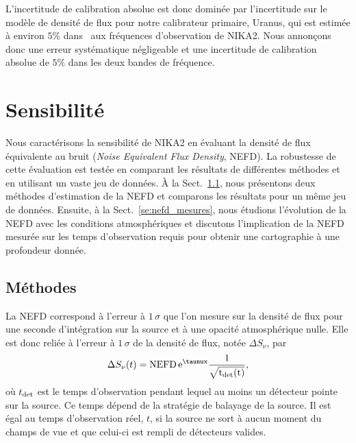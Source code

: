 L'incertitude de calibration absolue est donc dominée par
l'incertitude sur le modèle de densité de flux pour notre calibrateur
primaire, Uranus, qui est estimée à environ $5\%$
dans~\citet{Bendo2013} aux fréquences d'observation de NIKA2. Nous
annonçons donc une erreur systématique négligeable et une incertitude
de calibration absolue de $5\%$ dans les deux bandes de fréquence.





%
%
%
%
%
%
%
%
%
%
\section{Sensibilité}
\label{se:sensibilite}


Nous caractérisons la sensibilité de NIKA2 en évaluant la densité de
flux équivalente au bruit (\emph{Noise Equivalent Flux Density},
NEFD). La robustesse de cette évaluation est testée en comparant les
résultats de différentes méthodes et en utilisant un vaste jeu de
données. \`A la Sect.~\ref{se:nefd_methodes}, nous présentons deux
méthodes d'estimation de la NEFD et comparons les résultats pour un
même jeu de données. Ensuite, à la Sect.~\ref{se:nefd_mesures}, nous
étudions l'évolution de la NEFD avec les conditions atmosphériques et
discutons l'implication de la NEFD mesurée sur les temps d'observation
requis pour obtenir une cartographie à une profondeur donnée. 


\subsection{Méthodes}
\label{se:nefd_methodes}

La NEFD correspond à l'erreur à $1\,\sigma$ que l'on mesure sur la
densité de flux pour une seconde d'intégration sur la source et à une
opacité atmosphérique nulle. Elle est donc reliée à l'erreur à
$1\,\sigma$ de la densité de flux, notée $\Delta S_\nu$,  par
\begin{equation}
  \Delta S_\nu (t) = \rm{NEFD} \, e^{\taunu x} \frac{1}{\sqrt{t_{\rm det}(t)}}, 
\end{equation}
où $t_{\rm det}$ est le temps d'observation pendant lequel au moins un
détecteur pointe sur la source. Ce temps dépend de la stratégie de
balayage de la source. Il est égal au temps d'observation réel, $t$,
si la source ne sort à aucun moment du champs de vue et que celui-ci
est rempli de détecteurs valides.

